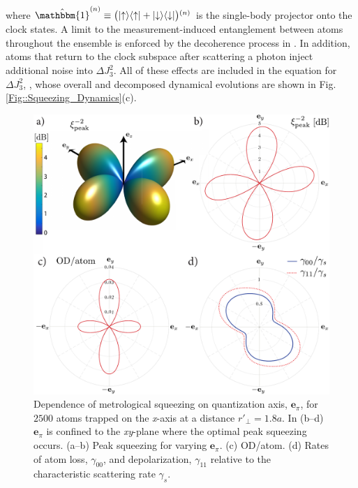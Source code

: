 \documentclass[aps,pra,twocolumn]{revtex4-1} %
\newcommand{\varz}{\Delta J_3^2}
\newcommand{\qaxis}{\mathbf{e}_\pi}
\begin{document}
where $\hat{\mathbbm{1}}^{(n)} \equiv \big( \op{\uparrow}{\uparrow} + \op{\downarrow}{\downarrow} \big){}^{(n)}$ is the single-body projector onto the clock states. 
A limit to the measurement-induced entanglement between atoms throughout the ensemble is enforced by the decoherence process in .  
In addition, atoms that return to the clock subspace after scattering a photon inject additional noise into $\varz$.  
All of these effects are included in the equation for $\varz$, , whose overall and decomposed dynamical evolutions are shown in Fig. \ref{Fig::Squeezing_Dynamics}(c). 


\begin{figure}
\includegraphics[scale=0.37]{./Figs/Fig_SqueezingQuantAxis}
\caption{Dependence of metrological squeezing on quantization axis, $\qaxis$, for $2500$ atoms trapped on the \emph{x}-axis at a distance $ r'\!_\perp=1.8a$. In (b--d) $\qaxis$ is confined to the \emph{xy}-plane where the optimal peak squeezing occurs.
(a--b) Peak squeezing for varying $\qaxis$. 
(c) OD/atom.
(d) Rates of atom loss, $\gamma_{00}$, and depolarization, $\gamma_{11}$ relative to the characteristic scattering rate $\gamma_s$. }\label{Fig::Squeezing_QuantizationAxis}
\end{figure}
\end{document}
